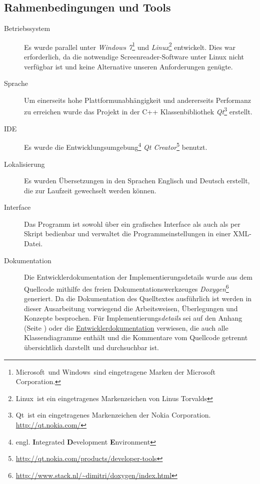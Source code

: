 \documentclass[	a4paper,		%
		titlepage, 		%
		fontsize=12pt		%
		]{scrartcl} 		%
\begin{document}
\subsection{Rahmenbedingungen und Tools}
\begin{description}
 \item[Betriebssystem]
 Es wurde parallel unter \emph{Windows 7}\footnote{Microsoft\textregistered ~und Windows\textregistered ~sind eingetragene Marken der Microsoft Corporation.} und \emph{Linux}\footnote{Linux\textregistered ~ist ein eingetragenes Markenzeichen von Linus Torvalds} entwickelt. Dies war erforderlich, da die notwendige Screenreader-Software unter Linux nicht verfügbar ist und keine Alternative unseren Anforderungen genügte.

 \item[Sprache]
Um einerseits hohe Plattformunabhängigkeit und andererseits Performanz zu erreichen wurde das Projekt in der C++ Klassenbibliothek \emph{Qt}\footnote{Qt\textregistered ~ist ein eingetragenes Markenzeichen der Nokia Corporation. \href{http://qt.nokia.com/}{http://qt.nokia.com/}} erstellt.

 \item[IDE]
Es wurde die Entwicklungsumgebung\footnote{engl. \textbf{I}ntegrated \textbf{D}evelopment \textbf{E}nvironment} \emph{Qt Creator}\footnote{\href{http://qt.nokia.com/products/developer-tools}{http://qt.nokia.com/products/developer-tools}} benutzt.

 \item[Lokalisierung]
Es wurden Übersetzungen in den Sprachen Englisch und Deutsch erstellt, die zur Laufzeit gewechselt werden können.

 \item[Interface]
Das Programm ist sowohl über ein grafisches Interface als auch als per Skript bedienbar und verwaltet die Programmeinstellungen in einer XML-Datei.

 \item[Dokumentation]
Die Entwicklerdokumentation der Implementierungsdetails wurde aus dem Quellcode mithilfe des freien Dokumentationswerkzeuges \emph{Doxygen}\footnote{\href{http://www.stack.nl/~dimitri/doxygen/index.html}{http://www.stack.nl/\textasciitilde dimitri/doxygen/index.html}} generiert.
Da die Dokumentation des Quelltextes ausführlich ist werden in dieser Ausarbeitung vorwiegend die Arbeitsweisen, Überlegungen und Konzepte besprochen. Für Implementierungs\emph{details} sei auf den Anhang (Seite \pageref{quellcode}) oder die \href{../documentation/html/index.html}{Entwicklerdokumentation} verwiesen, die auch alle Klassendiagramme enthält und die Kommentare vom Quellcode getrennt übersichtlich darstellt und durchsuchbar ist.


\end{description}
\end{document}
